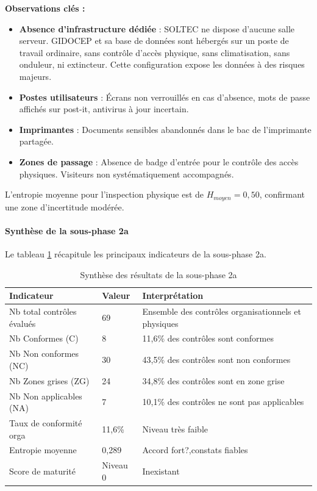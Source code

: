 \documentclass[12pt,a4paper,oneside]{report}
\begin{document}
\textbf{Observations clés :}
\begin{itemize}[label={\color{gold}}, leftmargin=*]
	\item \textbf{Absence d'infrastructure dédiée} : SOLTEC ne dispose 
	d'aucune salle serveur. GIDOCEP et sa base de données sont hébergés 
	sur un poste de travail ordinaire, sans contrôle d'accès physique, 
	sans climatisation, sans onduleur, ni extincteur. Cette configuration 
	expose les données à des risques majeurs.
	
	\item \textbf{Postes utilisateurs} : Écrans non verrouillés en cas 
	d'absence, mots de passe affichés sur post-it, antivirus à jour 
	incertain.
	
	\item \textbf{Imprimantes} : Documents sensibles abandonnés dans le 
	bac de l'imprimante partagée.
	
	\item \textbf{Zones de passage} : Absence de badge d'entrée pour le 
	contrôle des accès physiques. Visiteurs non systématiquement 
	accompagnés.
\end{itemize}

L'entropie moyenne pour l'inspection physique est de $H_{moyen} = 0,50$, 
confirmant une zone d'incertitude modérée.

\paragraph{Synthèse de la sous-phase 2a}

Le tableau \ref{tab:synthese_2a} récapitule les principaux indicateurs 
de la sous-phase 2a.

\begin{table}[H]
	\centering\small
	\caption{Synthèse des résultats de la sous-phase 2a}
	\label{tab:synthese_2a}
	\begin{tabularx}{\textwidth}{|p{5cm}|p{3cm}|X|}
		\toprule
		\rowcolor{theadcolor}
		\color{white}\textbf{Indicateur} &
		\color{white}\textbf{Valeur} &
		\color{white}\textbf{Interprétation} \\
		\midrule
		Nb total contrôles évalués & 69 & Ensemble des contrôles organisationnels et physiques \\
		Nb Conformes (C) & 8 & 11,6\% des contrôles sont conformes \\
		Nb Non conformes (NC) & 30 & 43,5\% des contrôles sont non conformes \\
		Nb Zones grises (ZG) & 24 & 34,8\% des contrôles sont en zone grise \\
		Nb Non applicables (NA) & 7 & 10,1\% des contrôles ne sont pas applicables \\
		Taux de conformité orga & 11,6\% & Niveau très faible \\
		Entropie moyenne & 0,289 & Accord fort?,constats fiables \\
		Score de maturité & Niveau 0 & Inexistant \\
		\bottomrule
	\end{tabularx}
\end{table}
\end{document}
